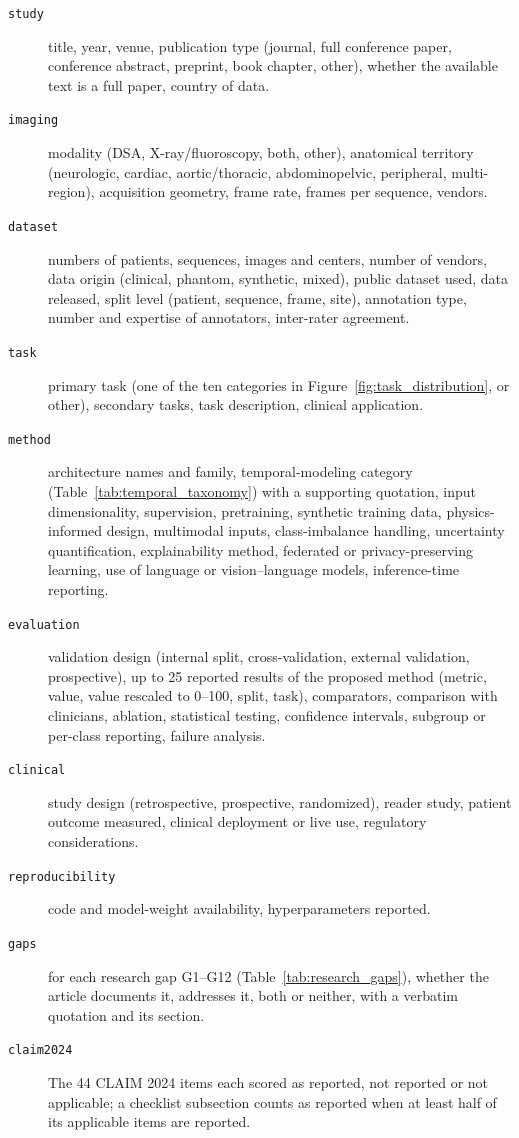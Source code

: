 \begin{description}
\item[\texttt{study}] title, year, venue, publication type (journal, full conference paper, conference abstract, preprint, book chapter, other), whether the available text is a full paper, country of data.
\item[\texttt{imaging}] modality (DSA, X-ray/fluoroscopy, both, other), anatomical territory (neurologic, cardiac, aortic/thoracic, abdominopelvic, peripheral, multi-region), acquisition geometry, frame rate, frames per sequence, vendors.
\item[\texttt{dataset}] numbers of patients, sequences, images and centers, number of vendors, data origin (clinical, phantom, synthetic, mixed), public dataset used, data released, split level (patient, sequence, frame, site), annotation type, number and expertise of annotators, inter-rater agreement.
\item[\texttt{task}] primary task (one of the ten categories in Figure~\ref{fig:task_distribution}, or other), secondary tasks, task description, clinical application.
\item[\texttt{method}] architecture names and family, temporal-modeling category (Table~\ref{tab:temporal_taxonomy}) with a supporting quotation, input dimensionality, supervision, pretraining, synthetic training data, physics-informed design, multimodal inputs, class-imbalance handling, uncertainty quantification, explainability method, federated or privacy-preserving learning, use of language or vision--language models, inference-time reporting.
\item[\texttt{evaluation}] validation design (internal split, cross-validation, external validation, prospective), up to 25 reported results of the proposed method (metric, value, value rescaled to 0--100, split, task), comparators, comparison with clinicians, ablation, statistical testing, confidence intervals, subgroup or per-class reporting, failure analysis.
\item[\texttt{clinical}] study design (retrospective, prospective, randomized), reader study, patient outcome measured, clinical deployment or live use, regulatory considerations.
\item[\texttt{reproducibility}] code and model-weight availability, hyperparameters reported.
\item[\texttt{gaps}] for each research gap G1--G12 (Table~\ref{tab:research_gaps}), whether the article documents it, addresses it, both or neither, with a verbatim quotation and its section.
\item[\texttt{claim2024}] The 44 CLAIM 2024 items  each scored as reported, not reported or not applicable; a checklist subsection counts as reported when at least half of its applicable items are reported.
\end{description}

